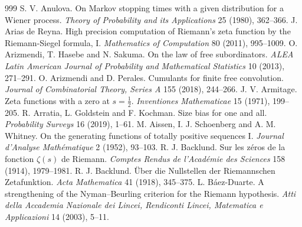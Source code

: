 \begin{thebibliography}{999}
 S. V. Anulova. On Markov stopping times with a given distribution for a Wiener process. \emph{Theory of Probability and its Applications} 25 (1980), 362--366.
 J. Arias de Reyna. High precision computation of Riemann's zeta function by the Riemann-Siegel formula, I. \emph{Mathematics of Computation} 80 (2011), 995--1009.
 O. Arizmendi, T. Hasebe and N. Sakuma. On the law of free subordinators. \emph{ALEA Latin American Journal of Probability and Mathematical Statistics} 10 (2013), 271--291.
 O. Arizmendi and D. Perales. Cumulants for finite free convolution. \emph{Journal of Combinatorial Theory, Series A} 155 (2018), 244--266.
 J. V. Armitage. Zeta functions with a zero at $s=\frac12$. \emph{Inventiones Mathematicae} 15 (1971), 199--205.
 R. Arratia, L. Goldstein and F. Kochman. Size bias for one and all. \emph{Probability Surveys} 16 (2019), 1--61.
 M. Aissen, I. J. Schoenberg and A. M. Whitney. On the generating functions of totally positive sequences I. \emph{Journal d'Analyse Math\'ematique} 2 (1952), 93--103.
 R. J. Backlund. Sur les z\'eros de la fonction $\zeta(s)$ de Riemann. \emph{Comptes Rendus de l'Acad\'emie des Sciences} 158 (1914), 1979--1981.
 R. J. Backlund. \"Uber die Nullstellen der Riemannschen Zetafunktion. \emph{Acta Mathematica} 41 (1918), 345--375.
 L. B\'aez-Duarte. A strengthening of the Nyman--Beurling criterion for the Riemann hypothesis. \emph{Atti della Accademia Nazionale dei Lincei, Rendiconti Lincei, Matematica e Applicazioni} 14 (2003), 5--11.

\end{thebibliography}
